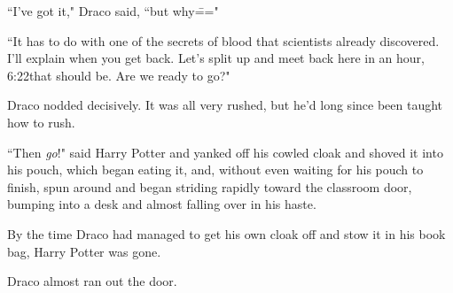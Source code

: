 ``I've got it," Draco said, ``but why\==="

``It has to do with one of the secrets of blood that scientists already discovered. I'll explain when you get back. Let's split up and meet back here in an hour, 6:22\pm that should be. Are we ready to go?"

Draco nodded decisively. It was all very rushed, but he'd long since been taught how to rush.

``Then \emph{go}!" said Harry Potter and yanked off his cowled cloak and shoved it into his pouch, which began eating it, and, without even waiting for his pouch to finish, spun around and began striding rapidly toward the classroom door, bumping into a desk and almost falling over in his haste.

By the time Draco had managed to get his own cloak off and stow it in his book bag, Harry Potter was gone.

Draco almost ran out the door.

